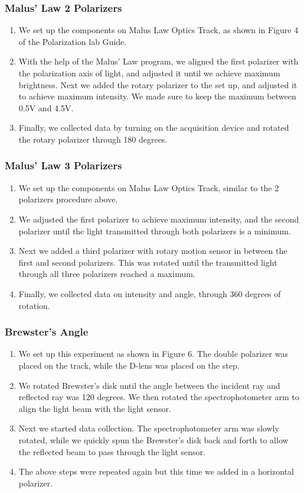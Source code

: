 \documentclass[a4paper, 11pt]{article}
\begin{document}
\subsubsection*{Malus' Law 2 Polarizers}
\begin{enumerate}
\item We set up the components on Malus Law Optics Track, as shown in Figure 4 of the Polarization lab Guide.
\item With the help of the Malus' Law program, we aligned the first polarizer with the polarization axis of light, and adjusted it until we achieve maximum brightness. Next we added the rotary polarizer to the set up, and adjusted it to achieve maximum intensity. We made sure to keep the maximum between 0.5V and 4.5V.
\item Finally, we collected data by turning on the acquisition device and rotated the rotary polarizer through 180 degrees.
\end{enumerate}

\subsubsection*{Malus' Law 3 Polarizers}
\begin{enumerate}
\item We set up the components on Malus Law Optics Track, similar to the 2 polarizers procedure above. 
\item We adjusted the first polarizer to achieve maximum intensity, and the second polarizer until the light transmitted through both polarizers is a minimum.
\item Next we added a third polarizer with rotary motion sensor in between the first and second polarizers. This was rotated until the transmitted light through all three polarizers reached a maximum.
\item Finally, we collected data on intensity and angle, through 360 degrees of rotation.
\end{enumerate}

\subsubsection*{Brewster's Angle}
\begin{enumerate}
\item We set up this experiment as shown in Figure 6. The double polarizer was placed on the track, while the D-lens was placed on the step.
\item We rotated Brewster's disk until the angle between the incident ray and reflected ray was 120 degrees. We then rotated the spectrophotometer arm to align the light beam with the light sensor.
\item Next we started data collection. The spectrophotometer arm was slowly rotated, while we quickly spun the Brewster's disk back and forth to allow the reflected beam to pass through the light sensor.
\item The above steps were repeated again but this time we added in a horizontal polarizer. 
\end{enumerate}
\end{document}
